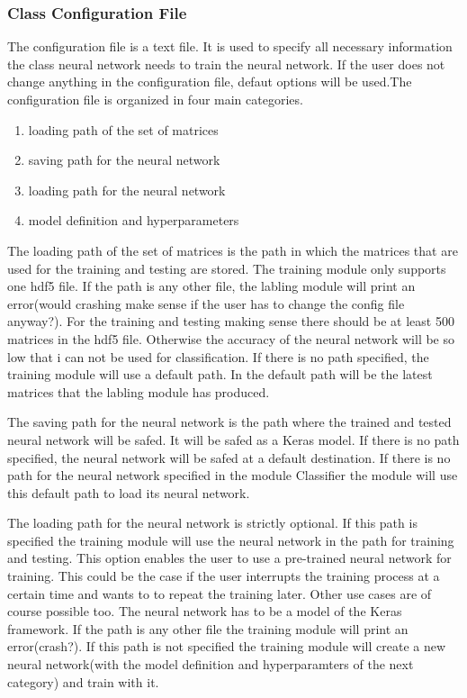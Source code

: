 \documentclass[parskip=full]{scrartcl}
\begin{document}
\subsubsection{Class Configuration File}
The configuration file is a text file.
It is used to specify all necessary information the class neural network needs to train the neural network.
If the user does not change anything in the configuration file, defaut options will be used.The configuration file is organized in four main categories. 
\begin{enumerate}
\item loading path of the set of matrices 
\item saving path for the neural network
\item loading path for the neural network
\item model definition and hyperparameters  
\end{enumerate}
The loading path of the set of matrices is the path in which the matrices that are used for the training and testing are stored.
The training module only supports one hdf5 file.
If the path is any other file, the labling module will print an error(would crashing make sense if the user has to change the config file anyway?).
For the training and testing making sense there should be at least 500 matrices in the hdf5 file.
Otherwise the accuracy of the neural network will be so low that i can not be used for classification.
If there is no path specified, the training module will use a default path.
In the default path will be the latest matrices that the labling module has produced. \newline

The saving path for the neural network is the path where the trained and tested neural network will be safed.
It will be safed as a Keras model.
If there is no path specified, the neural network will be safed at a default destination.
If there is no path for the neural network specified in the module Classifier the module will use this default path to load its neural network.\newline

The loading path for the neural network is strictly optional.
If this path is specified the training module will use the neural network in the path for training and testing.
This option enables the user to use a pre-trained neural network for training.
This could be the case if the user interrupts the training process at a certain time and wants to to repeat the training later.
Other use cases are of course possible too.
The neural network has to be a model of the Keras framework. If the path is any other file the training module will print an error(crash?).
If this path is not specified the training module will create a new neural network(with the model definition and hyperparamters of the next category) and train with it. \newline
\end{document}
